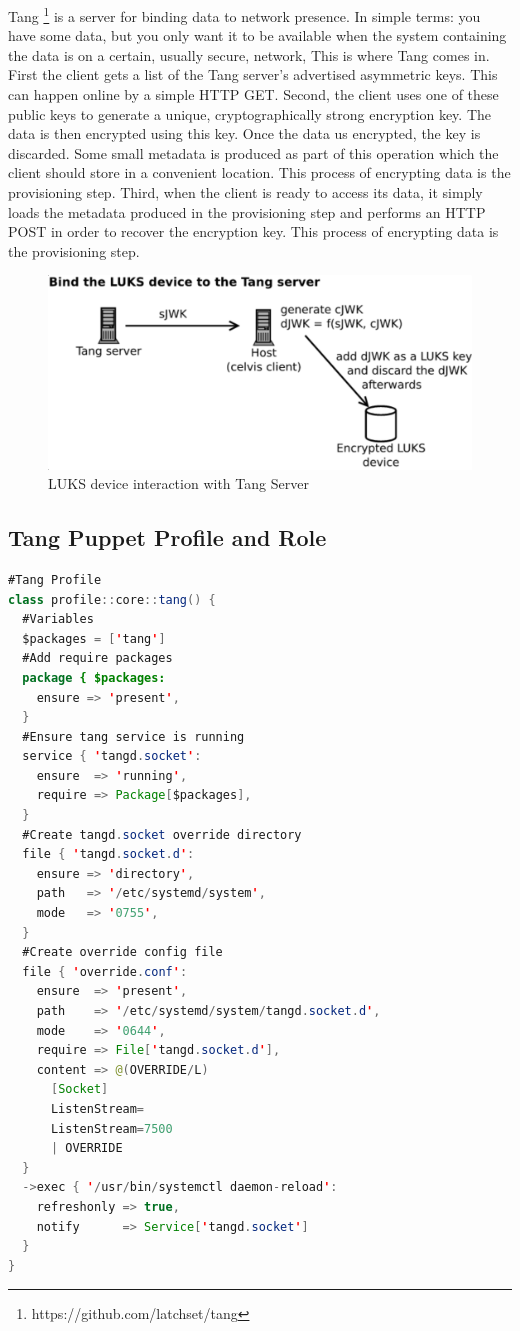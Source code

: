 Tang \footnote[3]{https://github.com/latchset/tang} is a server for binding data to network presence. In simple terms: you have some data, but you only want it to be available when the system containing the data is on a certain, usually secure, network, This is where Tang comes in.
First the client gets a list of the Tang server's advertised asymmetric keys. This can happen online by a simple HTTP GET. 
Second, the client uses one of these public keys to generate a unique, cryptographically strong encryption key. The data is then encrypted using this key. Once the data us encrypted, the key is discarded. Some small metadata is produced as part of this operation which the client should store in a convenient location. This process of encrypting data is the provisioning step.
Third, when the client is ready to access its data, it simply loads the metadata produced in the provisioning step and performs an HTTP POST in order to recover the encryption key. This process of encrypting data is the provisioning step.

\vskip 2cm
\begin{figure}
  \includegraphics[width=14cm]{images/image3.png}
  \centering
  \caption{LUKS device interaction with Tang Server}
\end{figure}

\newpage
\subsection{Tang Puppet Profile and Role}

\begin{lstlisting}[language=Java]
#Tang Profile
class profile::core::tang() {
  #Variables
  $packages = ['tang']
  #Add require packages
  package { $packages:
    ensure => 'present',
  }
  #Ensure tang service is running
  service { 'tangd.socket':
    ensure  => 'running',
    require => Package[$packages],
  }
  #Create tangd.socket override directory
  file { 'tangd.socket.d':
    ensure => 'directory',
    path   => '/etc/systemd/system',
    mode   => '0755',
  }
  #Create override config file
  file { 'override.conf':
    ensure  => 'present',
    path    => '/etc/systemd/system/tangd.socket.d',
    mode    => '0644',
    require => File['tangd.socket.d'],
    content => @(OVERRIDE/L)
      [Socket]
      ListenStream=
      ListenStream=7500
      | OVERRIDE
  }
  ->exec { '/usr/bin/systemctl daemon-reload':
    refreshonly => true,
    notify      => Service['tangd.socket']
  }
}
\end{lstlisting}


